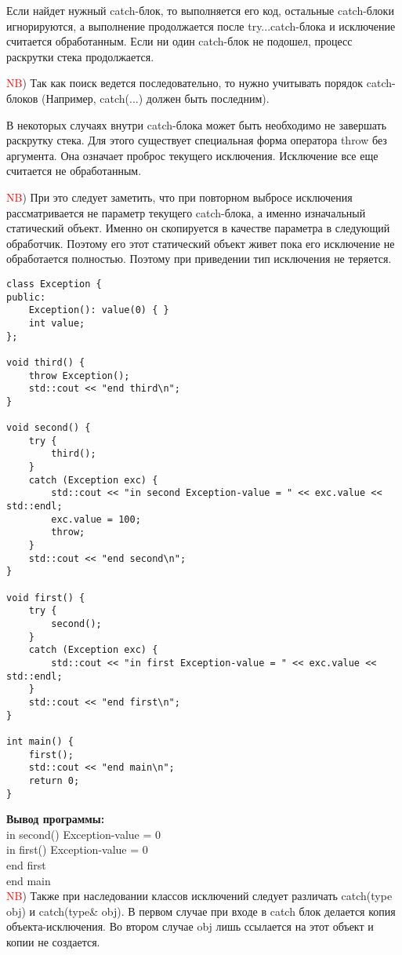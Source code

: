 Если найдет нужный catch-блок, то выполняется его код, остальные catch-блоки игнорируются, а выполнение продолжается после try...catch-блока и исключение считается обработанным. Если ни один catch-блок не подошел, процесс раскрутки стека продолжается.

\textcolor{red}{NB}) Так как поиск ведется последовательно, то нужно учитывать порядок catch-блоков (Например, catch(...) должен быть последним).

В некоторых случаях внутри catch-блока может быть необходимо не завершать раскрутку стека. Для этого существует специальная форма оператора throw без аргумента. Она означает проброс текущего исключения. Исключение все еще считается не обработанным.

\textcolor{red}{NB}) При это следует заметить, что при повторном выбросе исключения рассматривается не параметр текущего catch-блока, а именно изначальный статический объект. Именно он скопируется в качестве параметра в следующий обработчик. Поэтому его этот статический объект живет пока его исключение не обработается полностью. Поэтому при приведении тип исключения не теряется.

\begin{verbatim}
class Exception {
public:
    Exception(): value(0) { }
    int value;
};

void third() {
    throw Exception();
    std::cout << "end third\n";
}

void second() {
    try {
        third();
    }
    catch (Exception exc) {
        std::cout << "in second Exception-value = " << exc.value << std::endl;
        exc.value = 100;
        throw;
    }
    std::cout << "end second\n";
}

void first() {
    try {
        second();
    }
    catch (Exception exc) {
        std::cout << "in first Exception-value = " << exc.value << std::endl;
    }
    std::cout << "end first\n";
}

int main() {
    first();
    std::cout << "end main\n";
    return 0;
}
\end{verbatim}

\textbf{Вывод программы:} \\
in second() Exception-value = 0 \\
in first() Exception-value = 0 \\
end first \\
end main \\

\textcolor{red}{NB}) Также при наследовании классов исключений следует различать catch(type obj) и catch(type\& obj). В первом случае при входе в catch блок делается копия объекта-исключения. Во втором случае obj лишь ссылается на этот объект и копии не создается.

